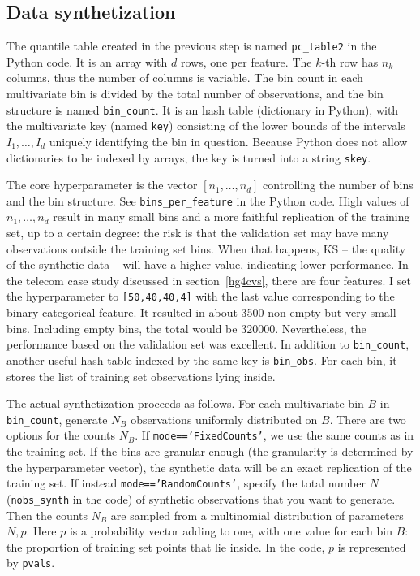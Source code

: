 \documentclass[oneside,10pt]{book}
\begin{document}
\subsection{Data synthetization}

The quantile table created in the previous step is named \texttt{pc\_table2} in the Python code. It is an array with
 $d$ rows, one per feature. The $k$-th row has $n_k$ columns, thus the number of columns is variable.  The bin count in each multivariate bin
 is divided by the total number of observations, and the bin structure is named \texttt{bin\_count}. It is an hash table
 (dictionary in Python), with the multivariate key (named \texttt{key}) consisting of the lower bounds of the intervals $I_1,\dots,I_d$
  uniquely identifying the bin in question. Because Python does not allow dictionaries to be indexed by arrays, the key is turned into
 a string \texttt{skey}.

The core \textcolor{index}{hyperparameter} is the vector $[n_1,\dots,n_d]$ controlling the number of bins and the bin structure. See \texttt{bins\_per\_feature} in the Python code. High values of $n_1,\dots,n_d$ result in many small bins and a more faithful replication of the training set, up to a certain degree:  the risk is that the validation set may have many observations outside the training set bins.
When that happens, KS -- the quality of the synthetic data -- will have a higher value, indicating lower performance. In the telecom case study
 discussed in section~\ref{hg4cvs}, there are four features.
I set the hyperparameter to \texttt{[50,40,40,4]} with the last value corresponding to the binary categorical feature. It resulted in about 3500 non-empty but very small bins. Including
 empty bins, the total would be $\num{320000}$. Nevertheless, the performance based on the validation set was excellent.
In addition to \texttt{bin\_count}, another useful hash table indexed by the same key is \texttt{bin\_obs}. For each bin,
it stores the list of training set observations lying inside.

The actual synthetization proceeds as follows. For each multivariate bin $B$ in \texttt{bin\_count}, generate $N_B$ observations uniformly distributed
 on $B$. There are two options for the counts $N_B$. If \texttt{mode=='FixedCounts'}, we use the same counts as in the training set. If the bins are granular enough (the granularity is determined by the hyperparameter vector), the synthetic data will be an exact replication of the training set.
If instead \texttt{mode=='RandomCounts'}, specify the total number $N$  (\texttt{nobs\_synth} in the code) of synthetic observations that you want to
 generate. Then the counts $N_B$ are sampled from a \textcolor{index}{multinomial distribution} of parameters $N, p$.
 Here $p$ is a probability vector adding to one, with one value for each bin $B$: the proportion of training set points that lie inside. In the code,
 $p$ is represented by \texttt{pvals}.
\end{document}
